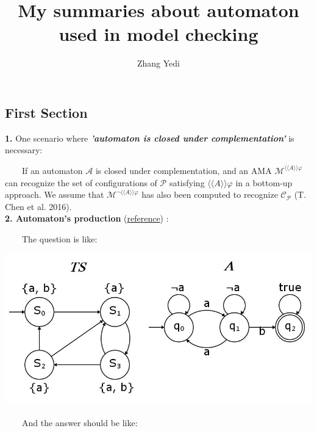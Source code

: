 \documentclass{sciposter}
\title{\huge{My summaries about automaton used in model checking}}
\author{\large{Zhang Yedi}}
\begin{document}
\selectfont

\maketitle



\begin{multicols}{3}
\section{First Section}	
    \textbf{1. }One scenario where \textbf{\emph{'automaton is closed under complementation'}} is necessary:

    ~~~~If an automaton $\mathcal{A}$ is closed under complementation, and an AMA $\mathcal{M}^{\langle\langle A\rangle\rangle\varphi}$ can recognize the set of configurations of $\mathcal{P}$ satisfying $\langle\langle A \rangle\rangle\varphi$ in a bottom-up approach. We assume that $\mathcal{M}^{\neg\langle\langle A \rangle\rangle\varphi }$ has also been computed to recognize $\mathcal{C}_{\mathcal{P}}$ (T. Chen et al. 2016).
    \\

    \textbf{2. Automaton's production} (\href{https://cs.stackexchange.com/questions/41268/product-of-a-transition-system-and-a-finite-automaton}{reference})
    :

    ~~~~The question is like:

    \includegraphics{figures/1-1-question.jpg}~\\[1cm]

    ~~~~And the answer should be like:


\end{multicols}
\end{document}
